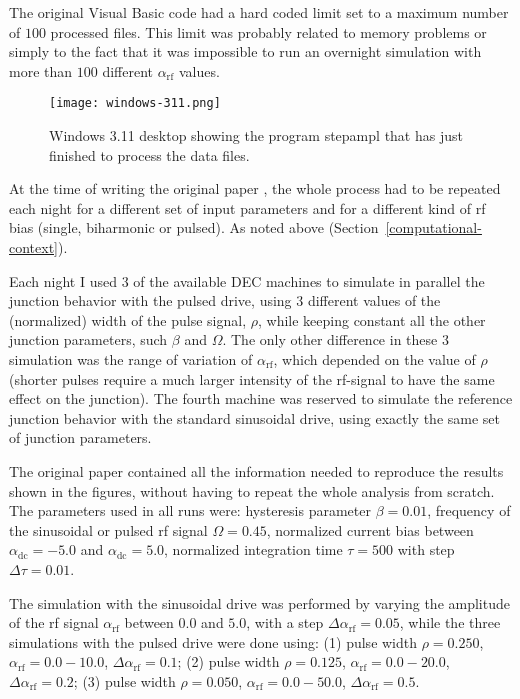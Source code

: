 The original Visual Basic code had a hard coded limit set to a maximum number of $100$ processed files. This limit was probably related to memory problems or simply to the fact that it was impossible to run an overnight simulation with more than $100$ different $\alpha_\mathrm{rf}$ values.

\begin{figure}[tbh]
	\centering
	\texttt{[image: windows-311.png]}
	\caption{Windows 3.11 desktop showing the program \textsf{stepampl} that has just finished to process the data files.}
	\label{fig:stepampl}
\end{figure}


At the time of writing the original paper \cite{Maggi:1996}, the whole process had to be repeated each night for a different set of input parameters  and for a different kind of rf bias (single, biharmonic or pulsed). As noted above (Section~\ref{computational-context}). 

Each night I used $3$ of the available DEC machines to simulate in parallel the junction behavior with the pulsed drive, using $3$ different values of the (normalized) width of the pulse signal, $\rho$, while keeping constant all the other junction parameters, such $\beta$ and $\Omega$.
The only other difference in these $3$ simulation was the range of variation of $\alpha_\mathrm{rf}$, which depended on the value of $\rho$ (shorter pulses require a much larger intensity of the rf-signal to have the same effect on the junction).
The fourth machine was reserved to simulate the reference junction behavior with the standard sinusoidal drive, using exactly the same set of junction parameters.

The original paper  contained all the information needed to reproduce the results shown in the figures, without having to repeat the whole analysis from scratch. 
The parameters used in all runs were: hysteresis parameter $\beta = 0.01$, frequency of the sinusoidal or pulsed  rf signal $\Omega = 0.45$, normalized current bias between $\alpha_\mathrm{dc} = -5.0$ and $\alpha_\mathrm{dc} = 5.0$, normalized integration time $\tau = 500$ with step $\Delta \tau = 0.01$. 

The simulation with the sinusoidal drive was performed by varying the amplitude of the rf signal $\alpha_\mathrm{rf}$ between $0.0$ and $5.0$, with a step $\Delta \alpha_\mathrm{rf} = 0.05$, while the three simulations with the pulsed drive were done using: 
(1) pulse width $\rho = 0.250$, $\alpha_\mathrm{rf} = 0.0 - 10.0$, $\Delta \alpha_\mathrm{rf} = 0.1$;
(2) pulse width $\rho = 0.125$, $\alpha_\mathrm{rf} = 0.0 - 20.0$, $\Delta \alpha_\mathrm{rf} = 0.2$;
(3) pulse width $\rho = 0.050$, $\alpha_\mathrm{rf} = 0.0 - 50.0$, $\Delta \alpha_\mathrm{rf} = 0.5$.

